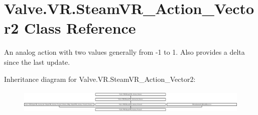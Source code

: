 \hypertarget{class_valve_1_1_v_r_1_1_steam_v_r___action___vector2}{}\section{Valve.\+V\+R.\+Steam\+V\+R\+\_\+\+Action\+\_\+\+Vector2 Class Reference}
\label{class_valve_1_1_v_r_1_1_steam_v_r___action___vector2}


An analog action with two values generally from -\/1 to 1. Also provides a delta since the last update.  


Inheritance diagram for Valve.\+V\+R.\+Steam\+V\+R\+\_\+\+Action\+\_\+\+Vector2\+:\begin{figure}[H]
\begin{center}
\leavevmode
\includegraphics[height=1.163032cm]{class_valve_1_1_v_r_1_1_steam_v_r___action___vector2}
\end{center}
\end{figure}
